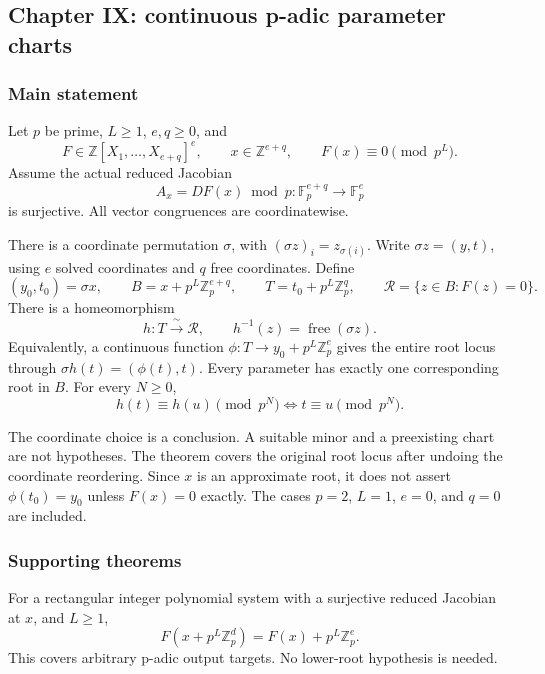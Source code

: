 \hypertarget{cont5:paper-ix-continuous-p-adic-parameter-charts}{%
\subsection{Chapter IX: continuous p-adic parameter
charts}\label{cont5:paper-ix-continuous-p-adic-parameter-charts}}

\hypertarget{cont5:main-statement}{%
\subsubsection{Main statement}\label{cont5:main-statement}}

Let \(p\) be prime, \(L\ge1\), \(e,q\ge0\), and \[
F\in\mathbb Z[X_1,\ldots,X_{e+q}]^e,\qquad
x\in\mathbb Z^{e+q},\qquad F(x)\equiv0\pmod{p^L}.
\] Assume the actual reduced Jacobian \[
A_x=DF(x)\bmod p:\mathbb F_p^{e+q}\longrightarrow\mathbb F_p^e
\] is surjective. All vector congruences are coordinatewise.

There is a coordinate permutation \(\sigma\), with
\((\sigma z)_i=z_{\sigma(i)}\). Write \(\sigma z=(y,t)\), using \(e\)
solved coordinates and \(q\) free coordinates. Define \[
(y_0,t_0)=\sigma x,\qquad
B=x+p^L\mathbb Z_p^{e+q},\qquad
T=t_0+p^L\mathbb Z_p^q,\qquad
\mathcal R=\{z\in B:F(z)=0\}.
\] There is a homeomorphism \[
h:T\xrightarrow{\ \sim\ }\mathcal R,\qquad
h^{-1}(z)=\operatorname{free}(\sigma z).
\] Equivalently, a continuous function
\(\phi:T\to y_0+p^L\mathbb Z_p^e\) gives the entire root locus through
\(\sigma h(t)=(\phi(t),t)\). Every parameter has exactly one
corresponding root in \(B\). For every \(N\ge0\), \[
\boxed{h(t)\equiv h(u)\pmod{p^N}\iff t\equiv u\pmod{p^N}.}
\]

The coordinate choice is a conclusion. A suitable minor and a
preexisting chart are not hypotheses. The theorem covers the original
root locus after undoing the coordinate reordering. Since \(x\) is an
approximate root, it does not assert \(\phi(t_0)=y_0\) unless \(F(x)=0\)
exactly. The cases \(p=2\), \(L=1\), \(e=0\), and \(q=0\) are included.

\hypertarget{cont5:supporting-theorems}{%
\subsubsection{Supporting theorems}\label{cont5:supporting-theorems}}

For a rectangular integer polynomial system with a surjective reduced
Jacobian at \(x\), and \(L\ge1\), \[
F(x+p^L\mathbb Z_p^d)=F(x)+p^L\mathbb Z_p^e.
\] This covers arbitrary p-adic output targets. No lower-root hypothesis
is needed.

